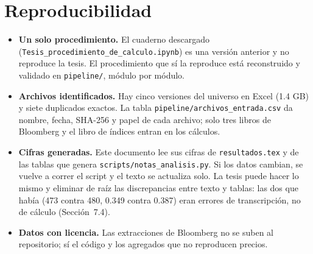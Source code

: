 \documentclass[11pt,letterpaper]{article}
\theoremstyle{definition}
\theoremstyle{plain}
\begin{document}
\section{Reproducibilidad}
\begin{itemize}
\item \textbf{Un solo procedimiento.} El cuaderno descargado (\texttt{Tesis\_procedimiento\_de\_calculo.ipynb}) es una versión anterior y no reproduce la tesis. El procedimiento que sí la reproduce está reconstruido y validado en \texttt{pipeline/}, módulo por módulo.
\item \textbf{Archivos identificados.} Hay cinco versiones del universo en Excel (1.4 GB) y siete duplicados exactos. La tabla \texttt{pipeline/archivos\_entrada.csv} da nombre, fecha, SHA-256 y papel de cada archivo; solo tres libros de Bloomberg y el libro de índices entran en los cálculos.
\item \textbf{Cifras generadas.} Este documento lee sus cifras de \texttt{resultados.tex} y de las tablas que genera \texttt{scripts/notas\_analisis.py}. Si los datos cambian, se vuelve a correr el script y el texto se actualiza solo. La tesis puede hacer lo mismo y eliminar de raíz las discrepancias entre texto y tablas: las dos que había (473 contra 480, 0.349 contra 0.387) eran errores de transcripción, no de cálculo (Sección~7.4).
\item \textbf{Datos con licencia.} Las extracciones de Bloomberg no se suben al repositorio; sí el código y los agregados que no reproducen precios.
\end{itemize}

\end{document}
